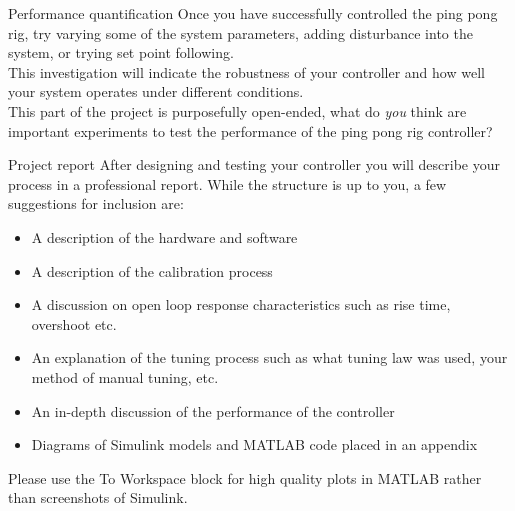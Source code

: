 \documentclass[9pt]{beamer-control}
\begin{document}
\begin{frame}{Performance quantification}
	Once you have successfully controlled the ping pong rig, try varying some of the system parameters, adding disturbance into the system, or trying set point following. \\
	\vspace{0.5cm}
	This investigation will indicate the robustness of your controller and how well your system operates under different conditions.\\
	\vspace{0.5cm}
	This part of the project is purposefully open-ended, what do \textit{you} think are important experiments to test the performance of the ping pong rig controller?
\end{frame}



\begin{frame}{Project report}
	After designing and testing your controller you will describe your process in a professional report. While the structure is up to you, a few suggestions for inclusion are:
	\begin{itemize}
		\item A description of the hardware and software
		\item A description of the calibration process
		\item A discussion on open loop response characteristics such as rise time, overshoot etc.
		\item An explanation of the tuning process such as what tuning law was used, your method of manual tuning, etc.
		\item An in-depth discussion of the performance of the controller
		\item Diagrams of Simulink models and MATLAB code placed in an appendix
	\end{itemize}
	Please use the To Workspace block for high quality plots in MATLAB rather than screenshots of Simulink.
\end{frame}


\SUMMARYFRAME
\end{document}
